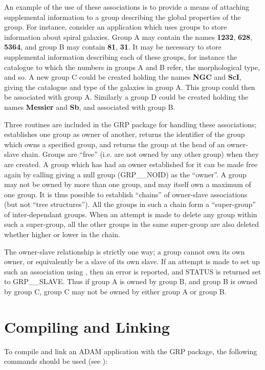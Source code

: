 An example of the use of these associations is to provide a means of attaching
supplemental information to a group describing the global properties of the
group. For instance, consider an application which uses groups to store
information about spiral galaxies. Group A may contain the names {\bf 1232},
{\bf 628}, {\bf 5364}, and group B may contain {\bf 81}, {\bf 31}. It may be
necessary to store supplemental information describing each of these groups, for
instance the catalogue to which the numbers in groups A and B refer, the
morphological type, and so. A new group C could be created holding the names
{\bf NGC} and {\bf ScI}, giving the catalogue and type of the galaxies in group
A. This group could then be associated with group A. Similarly a group D could
be created holding the names {\bf Messier} and {\bf Sb}, and associated with
group B.

Three routines are included in the GRP package for handling these associations;
 establishes one group as owner of another,  returns the
identifier of the group which owns a specified group, and  returns the
group at the head of an owner-slave chain. Groups are ``free'' (i.e. are not
owned by any other group) when they are created. A group which has had an owner
established for it can be made free again by calling  giving a null
group (GRP\_\_NOID) as the ``owner''. A group may not be owned by more than one
group, and may itself own a maximum of one group. It is thus possible to
establish ``chains'' of owner-slave associations (but not ``tree structures'').
All the groups in such a chain form a ``super-group'' of inter-dependant groups.
When an attempt is made to delete any group within such a super-group, all the
other groups in the same super-group are also deleted whether higher or lower in
the chain.

The owner-slave relationship is strictly one way; a group cannot own its own
owner, or equivalently be a slave of its own slave. If an attempt is
made to set up such an association using , then an error is reported,
and STATUS is returned set to GRP\_\_SLAVE. Thus if group A is owned by group B,
and group B is owned by group C, group C may not be owned by either group A or
group B.

\section{Compiling and Linking}
To compile and link an ADAM application with the GRP package, the following
commands should be used (see ):

